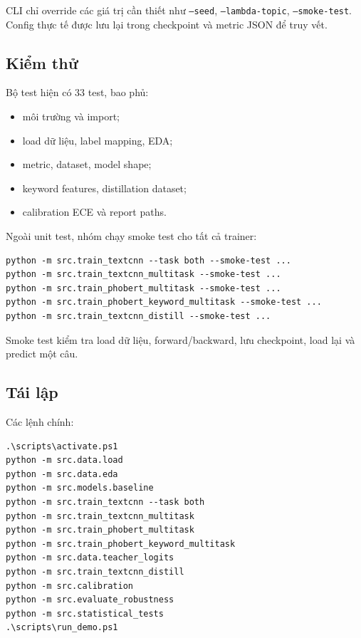 \documentclass[12pt,a4paper]{report}
\begin{document}
CLI chỉ override các giá trị cần thiết như \texttt{--seed}, \texttt{--lambda-topic}, \texttt{--smoke-test}. Config thực tế được lưu lại trong checkpoint và metric JSON để truy vết.

\subsection{Kiểm thử}

Bộ test hiện có 33 test, bao phủ:

\begin{itemize}[leftmargin=1.2cm]
  \item môi trường và import;
  \item load dữ liệu, label mapping, EDA;
  \item metric, dataset, model shape;
  \item keyword features, distillation dataset;
  \item calibration ECE và report paths.
\end{itemize}

Ngoài unit test, nhóm chạy smoke test cho tất cả trainer:

\begin{verbatim}
python -m src.train_textcnn --task both --smoke-test ...
python -m src.train_textcnn_multitask --smoke-test ...
python -m src.train_phobert_multitask --smoke-test ...
python -m src.train_phobert_keyword_multitask --smoke-test ...
python -m src.train_textcnn_distill --smoke-test ...
\end{verbatim}

Smoke test kiểm tra load dữ liệu, forward/backward, lưu checkpoint, load lại và predict một câu.

\subsection{Tái lập}

Các lệnh chính:

\begin{verbatim}
.\scripts\activate.ps1
python -m src.data.load
python -m src.data.eda
python -m src.models.baseline
python -m src.train_textcnn --task both
python -m src.train_textcnn_multitask
python -m src.train_phobert_multitask
python -m src.train_phobert_keyword_multitask
python -m src.data.teacher_logits
python -m src.train_textcnn_distill
python -m src.calibration
python -m src.evaluate_robustness
python -m src.statistical_tests
.\scripts\run_demo.ps1
\end{verbatim}
\end{document}
